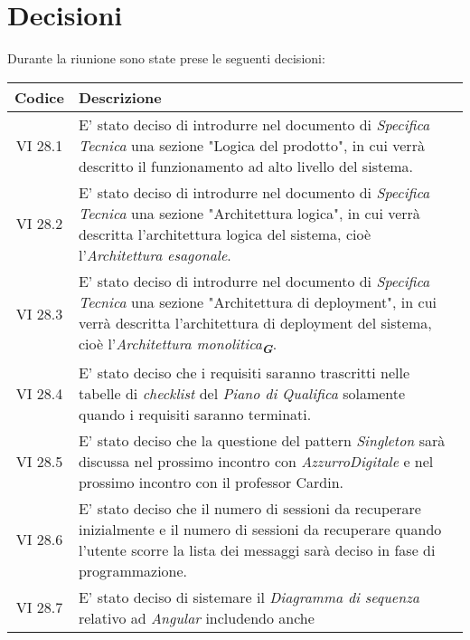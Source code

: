 
\section{Decisioni}

Durante la riunione sono state prese le seguenti decisioni:

\vspace{0.5cm}

\begin{table}[htbp]
    \centering
    \begin{tabular}{|c|p{}|}
        \hline
        \rowcolor[gray]{0.75}
        \textbf{Codice} & \textbf{Descrizione}\\
        \hline
        VI 28.1 & E' stato deciso di introdurre nel documento di \emph{Specifica Tecnica} una sezione "Logica del prodotto",
        in cui verrà descritto il funzionamento ad alto livello del sistema.\\
        \hline
        VI 28.2 & E' stato deciso di introdurre nel documento di \emph{Specifica Tecnica} una sezione "Architettura logica",
        in cui verrà descritta l'architettura logica del sistema, cioè l'\emph{Architettura esagonale}.\\
        \hline
        VI 28.3 & E' stato deciso di introdurre nel documento di \emph{Specifica Tecnica} una sezione "Architettura di deployment",
        in cui verrà descritta l'architettura di deployment del sistema, cioè l'\emph{Architettura monolitica}\textsubscript{\textit{\textbf{G}}}.\\
        \hline
        VI 28.4 & E' stato deciso che i requisiti saranno trascritti nelle tabelle di \emph{checklist} del \emph{Piano di Qualifica}
        solamente quando i requisiti saranno terminati.\\
        \hline
        VI 28.5 & E' stato deciso che la questione del pattern \emph{Singleton} sarà discussa nel prossimo incontro con
        \emph{AzzurroDigitale} e nel prossimo incontro con il professor Cardin.\\
        \hline
        VI 28.6 & E' stato deciso che il numero di sessioni da recuperare inizialmente e il numero di sessioni da recuperare
        quando l'utente scorre la lista dei messaggi sarà deciso in fase di programmazione.\\
        \hline
        VI 28.7 & E' stato deciso di sistemare il \emph{Diagramma di sequenza} relativo ad \emph{Angular} includendo anche 

\end{tabular}
\end{table}
